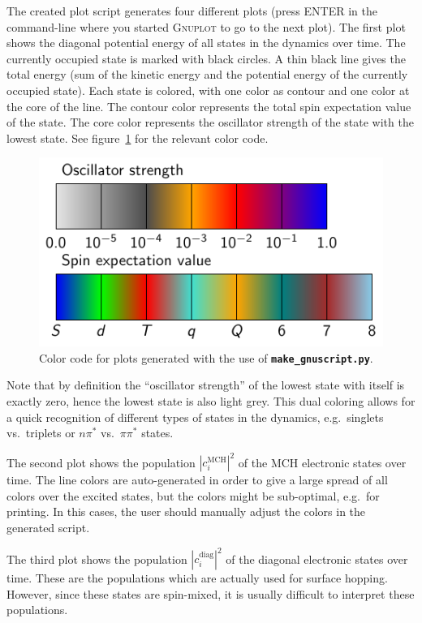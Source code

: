 \documentclass[a4paper,11pt,DIV=15,openany,twoside=false]{scrbook}
\newcommand{\ttt}[1]{\textbf{\texttt{#1}}}
\begin{document}
The created plot script generates four different plots (press ENTER in the command-line where you started \textsc{Gnuplot} to go to the next plot). The first plot shows the diagonal potential energy of all states in the dynamics over time. The currently occupied state is marked with black circles. A thin black line gives the total energy (sum of the kinetic energy and the potential energy of the currently occupied state). Each state is colored, with one color as contour and one color at the core of the line. The contour color represents the total spin expectation value of the state. The core color represents the oscillator strength of the state with the lowest state. See figure~\ref{fig:colors} for the relevant color code.
\begin{figure}
  \centering
  \includegraphics[scale=1]{img/colors/colors.pdf}
  \caption{Color code for plots generated with the use of \ttt{make\_gnuscript.py}.}
  \label{fig:colors}
\end{figure}
Note that by definition the ``oscillator strength'' of the lowest state with itself is exactly zero, hence the lowest state is also light grey. This dual coloring allows for a quick recognition of different types of states in the dynamics, e.g.\ singlets vs.\ triplets or $n\pi^*$ vs.\ $\pi\pi^*$ states.

The second plot shows the population $|c_i^{\text{MCH}}|^2$ of the MCH electronic states over time. The line colors are auto-generated in order to give a large spread of all colors over the excited states, but the colors might be sub-optimal, e.g.\ for printing. In this cases, the user should manually adjust the colors in the generated script.

The third plot shows the population $|c_i^{\text{diag}}|^2$ of the diagonal electronic states over time. These are the populations which are actually used for surface hopping. However, since these states are spin-mixed, it is usually difficult to interpret these populations.
\end{document}
